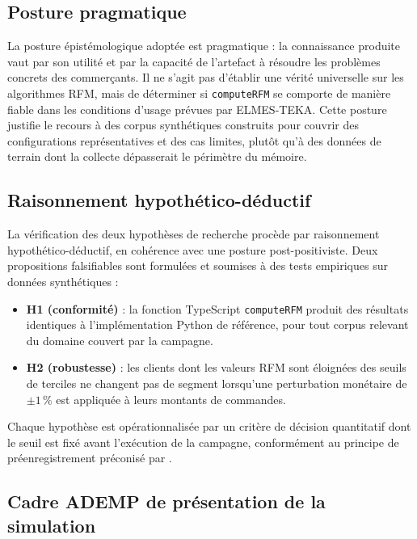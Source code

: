 \subsection{Posture pragmatique}
\label{subsec:methodes-pragmatisme}

La posture épistémologique adoptée est pragmatique : la connaissance produite vaut par
son utilité et par la capacité de l'artefact à résoudre les problèmes concrets des
commerçants. Il ne s'agit pas d'établir une vérité universelle sur les algorithmes RFM,
mais de déterminer si \texttt{computeRFM} se comporte de manière fiable dans les
conditions d'usage prévues par ELMES-TEKA. Cette posture justifie le recours à des
corpus synthétiques construits pour couvrir des configurations représentatives et des
cas limites, plutôt qu'à des données de terrain dont la collecte dépasserait le périmètre
du mémoire.

\subsection{Raisonnement hypothético-déductif}
\label{subsec:methodes-hypotheses}

La vérification des deux hypothèses de recherche procède par raisonnement
hypothético-déductif, en cohérence avec une posture post-positiviste. Deux propositions
falsifiables sont formulées et soumises à des tests empiriques sur données synthétiques :

\begin{itemize}
  \item \textbf{H1 (conformité)} : la fonction TypeScript \texttt{computeRFM} produit des
    résultats identiques à l'implémentation Python de référence, pour tout corpus relevant
    du domaine couvert par la campagne.
  \item \textbf{H2 (robustesse)} : les clients dont les valeurs RFM sont éloignées des
    seuils de terciles ne changent pas de segment lorsqu'une perturbation monétaire de
    $\pm1\,\%$ est appliquée à leurs montants de commandes.
\end{itemize}

Chaque hypothèse est opérationnalisée par un critère de décision quantitatif dont le seuil
est fixé avant l'exécution de la campagne, conformément au principe de préenregistrement
préconisé par \citet{Lakens2013}.

\subsection{Cadre ADEMP de présentation de la simulation}
\label{subsec:methodes-ademp}

